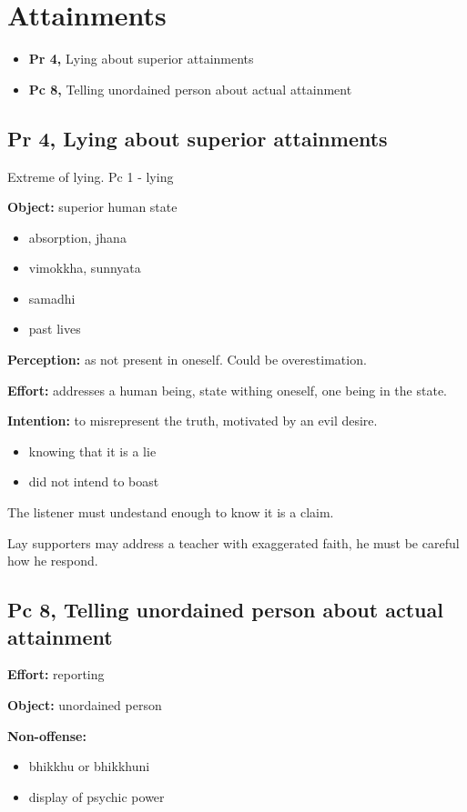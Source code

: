 \chapter{Attainments}

\begin{itemize}
\tightlist
\item
  \textbf{Pr 4,} Lying about superior attainments
\item
  \textbf{Pc 8,} Telling unordained person about actual attainment
\end{itemize}

\section{Pr 4, Lying about superior attainments}

Extreme of lying. Pc 1 - lying

\textbf{Object:} superior human state

\begin{itemize}
\tightlist
\item
  absorption, jhana
\item
  vimokkha, sunnyata
\item
  samadhi
\item
  past lives
\end{itemize}

\textbf{Perception:} as not present in oneself. Could be overestimation.

\textbf{Effort:} addresses a human being, state withing oneself, one
being in the state.

\textbf{Intention:} to misrepresent the truth, motivated by an evil
desire.

\begin{itemize}
\tightlist
\item
  knowing that it is a lie
\item
  did not intend to boast
\end{itemize}

The listener must undestand enough to know it is a claim.

Lay supporters may address a teacher with exaggerated faith, he must be
careful how he respond.

\section{Pc 8, Telling unordained person about actual attainment}

\textbf{Effort:} reporting

\textbf{Object:} unordained person

\textbf{Non-offense:}

\begin{itemize}
\tightlist
\item
  bhikkhu or bhikkhuni
\item
  display of psychic power
\end{itemize}

